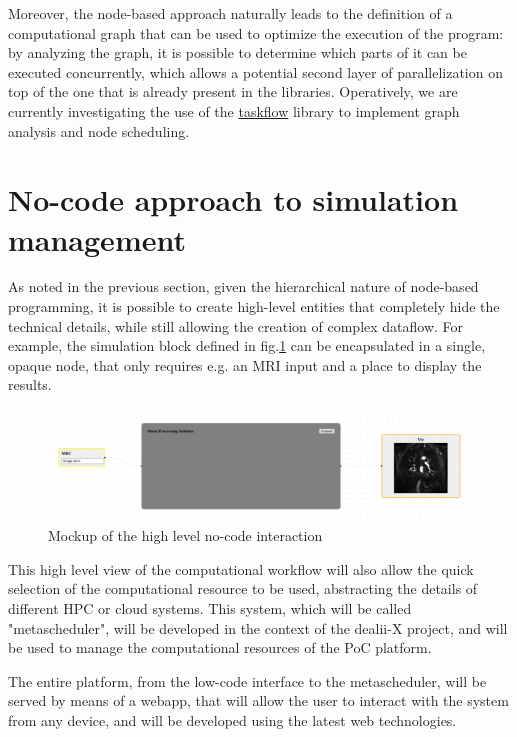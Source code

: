 \documentclass[a4paper,12pt]{article}
\begin{document}
Moreover, the node-based approach naturally leads to the definition of a computational graph that can be used to optimize the execution of the program: by analyzing the graph, it is possible to determine which parts of it can be executed concurrently, which allows a potential second layer of parallelization on top of the one that is already present in the libraries. Operatively, we are currently investigating the use of the \href{https://github.com/taskflow/taskflow}{taskflow} library to implement graph analysis and node scheduling.   

\section{\textcolor{EUblue}{No-code approach to simulation management}}

As noted in the previous section, given the hierarchical nature of node-based programming, it is possible to create high-level entities that completely hide the technical details, while still allowing the creation of complex dataflow. For example, the simulation block defined in fig.\ref{nocode-sim} can be encapsulated in a single, opaque node, that only requires e.g. an MRI input and a place to display the results. 

\begin{figure}
    \includegraphics[width=400pt]{nocode-sim.png}
    \caption{Mockup of the high level no-code interaction}
    \label{nocode-sim}
\end{figure}


This high level view of the computational workflow will also allow the quick selection of the computational resource to be used, abstracting the details of different HPC or cloud systems. This system, which will be called "metascheduler", will be developed in the context of the dealii-X project, and will be used to manage the computational resources of the PoC platform.

The entire platform, from the low-code interface to the metascheduler, will be served by means of a webapp, that will allow the user to interact with the system from any device, and will be developed using the latest web technologies. 
\end{document}
